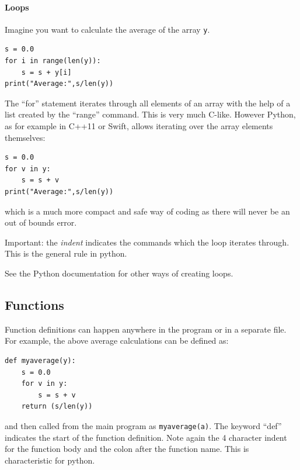 \documentclass[12pt,a4paper]{article}
\begin{document}
\paragraph{Loops}
Imagine you want to calculate the average of the array \texttt{y}.
\begin{verbatim}
s = 0.0
for i in range(len(y)):
    s = s + y[i]
print("Average:",s/len(y))
\end{verbatim}
The ``for'' statement iterates through all elements of an array with
the help of a list created by the ``range'' command. This is very much
C-like. However Python, as for example in C++11 or Swift, allows iterating over the array elements
themselves:
\begin{verbatim}
s = 0.0
for v in y:
    s = s + v
print("Average:",s/len(y))
\end{verbatim}
which is a much more compact and safe way of coding as there will
never be an out of bounds error.

Important: the \textsl{indent} indicates the commands which the loop
iterates through. This is the general rule in python.

See the Python documentation for other ways of creating loops.


\subsection{Functions}
Function definitions can happen anywhere in the program or in a separate file.
For example, the above average calculations can be defined as:

\begin{verbatim}
def myaverage(y):
    s = 0.0
    for v in y:
        s = s + v
    return (s/len(y))
\end{verbatim}
and then called from the main program as \texttt{myaverage(a)}.  The
keyword ``def'' indicates the start of the function definition.  Note
again the 4 character indent for the function body and the colon after
the function name. This is characteristic for python.
\end{document}
